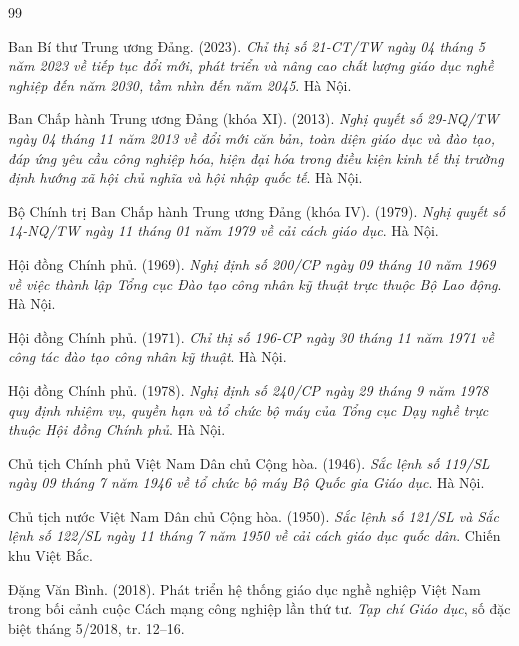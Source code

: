 \renewcommand{\refname}{DANH MỤC TÀI LIỆU THAM KHẢO}

\begin{thebibliography}{99}

Ban Bí thư Trung ương Đảng. (2023). \textit{Chỉ thị số 21-CT/TW ngày 04 tháng 5 năm 2023 về tiếp tục đổi mới, phát triển và nâng cao chất lượng giáo dục nghề nghiệp đến năm 2030, tầm nhìn đến năm 2045}. Hà Nội.

Ban Chấp hành Trung ương Đảng (khóa XI). (2013). \textit{Nghị quyết số 29-NQ/TW ngày 04 tháng 11 năm 2013 về đổi mới căn bản, toàn diện giáo dục và đào tạo, đáp ứng yêu cầu công nghiệp hóa, hiện đại hóa trong điều kiện kinh tế thị trường định hướng xã hội chủ nghĩa và hội nhập quốc tế}. Hà Nội.

Bộ Chính trị Ban Chấp hành Trung ương Đảng (khóa IV). (1979). \textit{Nghị quyết số 14-NQ/TW ngày 11 tháng 01 năm 1979 về cải cách giáo dục}. Hà Nội.

Hội đồng Chính phủ. (1969). \textit{Nghị định số 200/CP ngày 09 tháng 10 năm 1969 về việc thành lập Tổng cục Đào tạo công nhân kỹ thuật trực thuộc Bộ Lao động}. Hà Nội.

Hội đồng Chính phủ. (1971). \textit{Chỉ thị số 196-CP ngày 30 tháng 11 năm 1971 về công tác đào tạo công nhân kỹ thuật}. Hà Nội.

Hội đồng Chính phủ. (1978). \textit{Nghị định số 240/CP ngày 29 tháng 9 năm 1978 quy định nhiệm vụ, quyền hạn và tổ chức bộ máy của Tổng cục Dạy nghề trực thuộc Hội đồng Chính phủ}. Hà Nội.

Chủ tịch Chính phủ Việt Nam Dân chủ Cộng hòa. (1946). \textit{Sắc lệnh số 119/SL ngày 09 tháng 7 năm 1946 về tổ chức bộ máy Bộ Quốc gia Giáo dục}. Hà Nội.

Chủ tịch nước Việt Nam Dân chủ Cộng hòa. (1950). \textit{Sắc lệnh số 121/SL và Sắc lệnh số 122/SL ngày 11 tháng 7 năm 1950 về cải cách giáo dục quốc dân}. Chiến khu Việt Bắc.

Đặng Văn Bình. (2018). Phát triển hệ thống giáo dục nghề nghiệp Việt Nam trong bối cảnh cuộc Cách mạng công nghiệp lần thứ tư. \textit{Tạp chí Giáo dục}, số đặc biệt tháng 5/2018, tr. 12--16.


\end{thebibliography}
